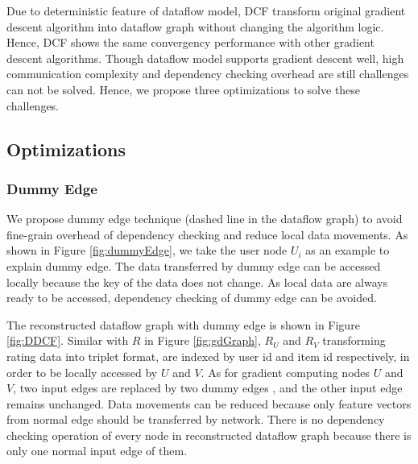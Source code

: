 \documentclass{llncs}
\begin{document}
Due to deterministic feature of dataflow model, DCF transform original gradient descent algorithm into dataflow graph without changing the algorithm logic. Hence, DCF shows the same convergency performance with other gradient descent algorithms. Though dataflow model supports gradient descent well, high communication complexity and dependency checking overhead are still challenges can not be solved. Hence, we propose three optimizations to solve these challenges.

\vspace{-10pt}
\subsection{Optimizations}
\subsubsection{Dummy Edge}

We propose dummy edge technique (dashed line in the dataflow graph) to avoid fine-grain overhead of dependency checking and reduce local data movements. As shown in Figure \ref{fig:dummyEdge}, we take the user node $U_i$ as an example to explain dummy edge. The data transferred by dummy edge can be accessed locally because the key of the data does not change. As local data are always ready to be accessed, dependency checking of dummy edge can be avoided.

The reconstructed dataflow graph with dummy edge is shown in Figure \ref{fig:DDCF}. Similar with $R$ in Figure \ref{fig:gdGraph}, $R_U$ and $R_V$ transforming rating data into triplet format, are indexed by user id and item id respectively, in order to be locally accessed by $U$ and $V$. As for gradient computing nodes $U$ and $V$, two input edges are replaced by two dummy edges , and the other input edge remains unchanged. Data movements can be reduced because only feature vectors from normal edge
should be transferred by network.
There is no dependency checking operation of every node in reconstructed dataflow graph because there is only one normal input edge of them.
\vspace{-10pt}
\end{document}
